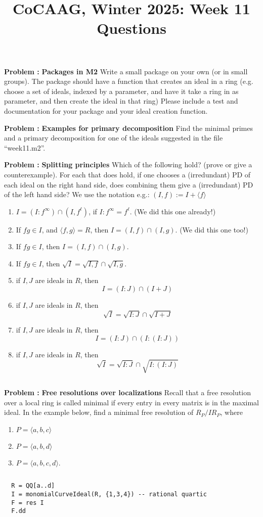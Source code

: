 \documentclass[11pt]{amsart}
\numberwithin{equation}{section}
\newcommand{\bnum}{\begin{enumerate}} %
\newcommand{\babc}{\bnum\renewcommand{\labelenumi}{(\alph{enumi})}}%
\newcommand{\eabc}{\end{enumerate}}
\theoremstyle{definition}
\theoremstyle{remark}
\newcounter{excount}
\newcommand\exercise[1]{\addtocounter{excount}{1}\noindent\textbf{Problem \arabic{excount}: }#1{$ $}\\}
\begin{document}
\setcounter{excount}{0}

\title{CoCAAG, Winter 2025: Week 11 Questions}
\maketitle
\vspace{0.5cm}

\bigskip

\exercise{{\bf Packages in M2}
  Write a small package on your own (or in small groups).  The package should have a function that creates an ideal
  in a ring (e.g. choose a set of ideals, indexed by a parameter, and have it take a ring in as parameter,
  and then create the ideal in that ring)  Please include a test and documentation for your package and your ideal creation
  function.
}

\exercise{{\bf Examples for primary decomposition}
  Find the minimal primes and a primary decomposition for one of the ideals suggested in the
  file ``week11.m2''.
  }

\exercise{{\bf Splitting principles}
  Which of the following hold? (prove or give a counterexample).
  For each that does hold, if one chooses a (irredundant) PD of each ideal on the right hand side,
  does combining them give a (irredundant) PD of the left hand side?
  We use the notation e.g.: $(I,f) := I + \langle f \rangle$
  \babc
\item $I = (I : f^\infty) \cap (I, f^\ell)$, if $I : f^\infty = f^\ell$.  (We did this one already!)
\item If $fg \in I$, and $\langle f, g \rangle = R$, then $I = (I,f) \cap (I,g)$. (We did this one too!)
\item If $fg \in I$, then ${I} = (I,f) \cap (I,g)$.
\item If $fg \in I$, then $\sqrt{I} = \sqrt{I,f} \cap \sqrt{I,g}$.
\item if $I, J$ are ideals in $R$, then
  \[ I = (I : J) \cap (I+J) \]
\item if $I, J$ are ideals in $R$, then
  \[ \sqrt{I} = \sqrt{I : J} \cap \sqrt{I+J} \]
\item if $I, J$ are ideals in $R$, then
  \[ {I} = (I : J) \cap (I : (I : J)) \]
\item if $I, J$ are ideals in $R$, then
  \[ \sqrt{I} = \sqrt{I : J} \cap \sqrt{I : (I : J)} \]
  \eabc
}

\exercise{{\bf Free resolutions over localizations}
  Recall that a free resolution over a local ring is called minimal if
  every entry in every matrix is in the maximal ideal.
  In the example below, find a minimal free resolution of $R_P/IR_P$, where
  \babc
  \item $P = \langle a,b,c \rangle$
  \item $P = \langle a,b,d \rangle$
  \item $P = \langle a,b,c,d \rangle$.
  \eabc
  }
{\tiny\begin{verbatim}
  R = QQ[a..d]
  I = monomialCurveIdeal(R, {1,3,4}) -- rational quartic
  F = res I
  F.dd
\end{verbatim}
}
\end{document}
